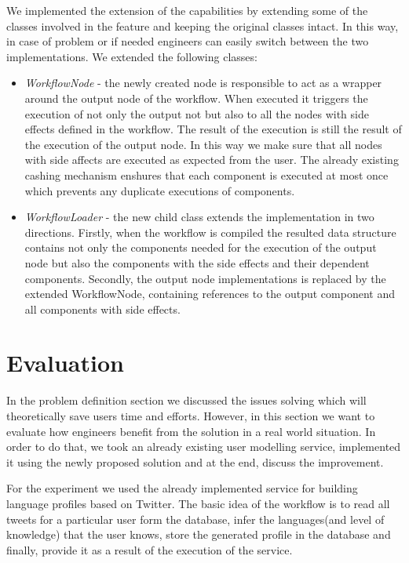 \documentclass[a4paper, notitlepage]{article}
\begin{document}
We implemented the extension of the capabilities by extending some of the classes involved in the feature and keeping the original classes intact. In this way, in case of problem or if needed engineers can easily switch between the two implementations. We extended the following classes:

\begin{itemize}
	\item \textit{WorkflowNode} - the newly created node is responsible to act as a wrapper around the output node of the workflow. When executed it triggers the execution of not only the output not but also to all the nodes with side effects defined in the workflow. The result of the execution is still the result of the execution of the output node. In this way we make sure that all nodes with side affects are executed as expected from the user. The already existing cashing mechanism enshures that each component is executed at most once which prevents any duplicate executions of components.
	
	\item \textit{WorkflowLoader} - the new child class extends the implementation in two directions. Firstly, when the workflow is compiled the resulted data structure contains not only the components needed for the execution of the output node but also the components with the side effects and their dependent components. Secondly, the output node implementations is replaced by the extended WorkflowNode, containing references to the output component and all components with side effects.
\end{itemize}


\section{Evaluation} 

In the problem definition section we discussed the issues solving which will theoretically save users time and efforts. However,  in this section we want to evaluate how engineers benefit from the solution in a real world situation. In order to do that, we took an already existing user modelling service, implemented it using the newly proposed solution and at the end, discuss the improvement. 

For the experiment we used the already implemented service for building language profiles based on Twitter. The basic idea of the workflow is to read all tweets for a particular user form the database, infer the languages(and level of knowledge) that the user knows, store the generated profile in the database and finally, provide it as a result of the execution of the service.
\end{document}
